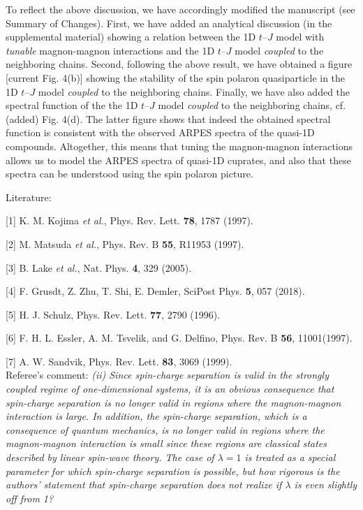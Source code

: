 \documentclass[%
 manuscript,
 amsmath,amssymb,
 aps, onecolumn,
prl,
]{revtex4-1}
\begin{document}
To reflect the above discussion, we have accordingly modified the manuscript (see Summary of Changes). First, we have added an analytical discussion (in the supplemental material) showing a relation between the 1D $t$--$J$ model with  {\it tunable} magnon-magnon interactions and the 1D $t$--$J$ model {\it coupled} to the neighboring chains. Second, following the above result, we have obtained a figure [current Fig. 4(b)] showing the stability of the spin polaron quasiparticle in the 1D $t$--$J$ model {\it coupled} to the neighboring chains. Finally, we have also added the spectral function of the the 1D $t$--$J$ model {\it coupled} to the neighboring chains, cf. (added) Fig. 4(d). The latter figure shows that indeed the obtained spectral function is consistent with the observed ARPES spectra of the quasi-1D compounds. Altogether, this means that tuning the magnon-magnon interactions allows us to model the ARPES spectra of quasi-1D cuprates, and also that these spectra can be understood using the spin polaron picture.

Literature:

[1] K. M. Kojima {\it et al.}, Phys. Rev. Lett. {\bf 78}, 1787 (1997).

[2] M. Matsuda {\it et al.}, Phys. Rev. B {\bf 55}, R11953 (1997). 

[3] B. Lake {\it et al.}, Nat. Phys. {\bf 4}, 329 (2005).

[4] F. Grusdt, Z. Zhu, T. Shi, E. Demler, SciPost Phys. {\bf 5}, 057 (2018).

[5] H. J. Schulz, Phys. Rev. Lett. {\bf 77}, 2790 (1996).

[6] F. H. L. Essler, A. M. Tsvelik, and G. Delfino, Phys. Rev. B {\bf 56}, 11001(1997). 

[7] A. W. Sandvik, Phys. Rev. Lett. {\bf 83}, 3069 (1999).
\\

Referee's comment: {\it \color{blue}(ii) Since spin-charge separation is valid in the strongly coupled
regime of one-dimensional systems, it is an obvious consequence that
spin-charge separation is no longer valid in regions where the
magnon-magnon interaction is large. In addition, the spin-charge
separation, which is a consequence of quantum mechanics, is no longer
valid in regions where the magnon-magnon interaction is small since
these regions are classical states described by linear spin-wave
theory. The case of $\lambda=1$ is treated as a special parameter for
which spin-charge separation is possible, but how rigorous is the
authors' statement that spin-charge separation does not realize if
$\lambda$ is even slightly off from 1?}
\end{document}
